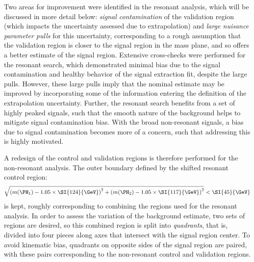 Two areas for improvement were identified in the resonant analysis, which will be discussed in more detail below: 
\emph{signal contamination} of the validation region (which impacts the uncertainty assessed due to extrapolation)
and \emph{large nuisance parameter pulls} for this uncertainty, corresponding to a rough assumption that the 
validation region is closer to the signal region in the mass plane, and so offers a better estimate of the 
signal region. Extensive cross-checks were performed for the resonant search, which demonstrated minimal 
bias due to the signal contamination and healthy behavior of the signal extraction fit, despite 
the large pulls. However, these large pulls imply that the nominal estimate may be improved by 
incorporating some of the information entering the definition of the extrapolation uncertainty. Further, 
the resonant search benefits from a set of highly peaked signals, such that the smooth nature of the 
background helps to mitigate signal contamination bias. With the broad non-resonant signals, 
a bias due to signal contamination becomes more of a concern, such that addressing this is highly 
motivated.

A redesign of the control and validation regions is therefore performed for 
the non-resonant analysis. The outer boundary defined by the shifted resonant control region:
\begin{equation}
	\label{eqn:ctrl-reg-def}
	\sqrt{\qty(\mh1 - 1.05 \times \SI{124}{\GeV})^{2} + \qty(\mh2 - 1.05 \times
		\SI{117}{\GeV})^{2}} < \SI{45}{\GeV}
\end{equation}
is kept, roughly corresponding to combining the regions used for the resonant analysis. In order 
to assess the variation of the background estimate, two sets of regions are desired, so this combined 
region is split into \emph{quadrants}, that is, divided into four pieces along axes that intersect 
with the signal region center. To avoid kinematic bias, quadrants on opposite sides of the signal 
region are paired, with these pairs corresponding to the non-resonant control and validation regions.

